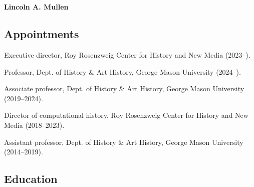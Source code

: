 \documentclass[11pt]{article}
\begin{document}
\thispagestyle{fancy}
\fancyfoot{}
\fancyhead{}
\renewcommand{\headrulewidth}{0pt}

\hfill\hfill\hfill
\hfill\hfill\hfill
\hfill\hfill\hfill
\hfill\hfill\hfill
\begin{minipage}[t]{2.2in}
   \\
   \\
\end{minipage}
\hfill
\begin{minipage}[t]{3.0in}
\end{minipage}

\vspace{0.4in}

{\Large\sffamily\bfseries Lincoln A. Mullen}\\[-0.1in]

\subsection{Appointments}\label{Appointments}

Executive director, Roy Rosenzweig Center for History and New Media (2023--).

Professor, Dept. of History \& Art History, George Mason University 
(2024--).

Associate professor, Dept. of History \& Art History, George Mason University 
(2019--2024).

Director of computational history, Roy Rosenzweig Center for History and New 
Media (2018--2023).

Assistant professor, Dept. of History \& Art History, George Mason University (2014--2019).

\subsection{Education}\label{Education}
\end{document}
